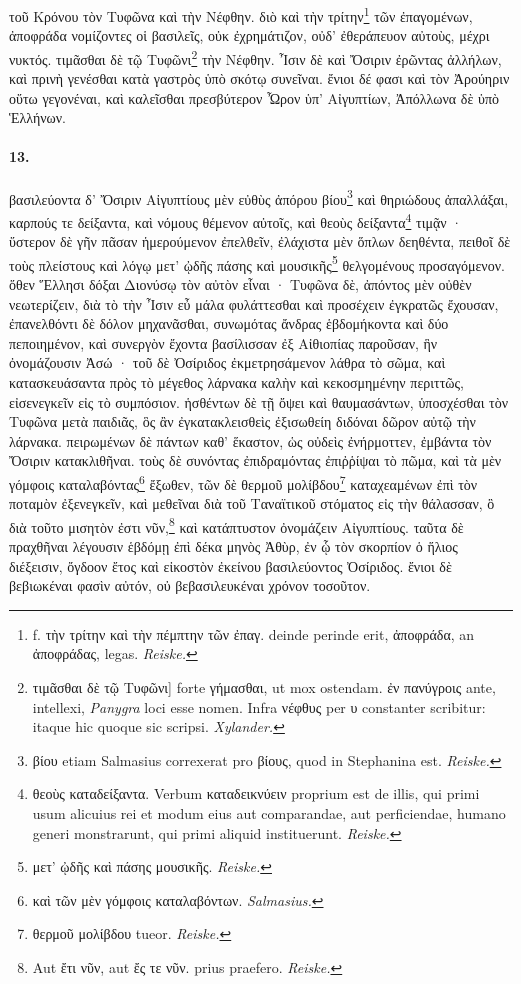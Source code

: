 \documentclass[a4paper, 11pt, oneside, polutonikogreek, german, landscape]{article}
\begin{document}
τοῦ Κρόνου τὸν Τυφῶνα καὶ τὴν Νέφθην. διὸ καὶ τὴν τρίτην\footnote{f. τὴν τρίτην καὶ τὴν πέμπτην τῶν ἐπαγ. deinde perinde erit, ἀποφράδα, an ἀποφράδας, legas. \emph{Reiske.}} τῶν ἐπαγομένων, ἀποφράδα νομίζοντες οἱ βασιλεῖς, οὐκ ἐχρημάτιζον, οὐδ' ἐθεράπευον αὐτοὺς, μέχρι νυκτός. τιμᾶσθαι δὲ τῷ Τυφῶνι\footnote{τιμᾶσθαι δὲ τῷ Τυφῶνι] forte γήμασθαι, ut mox ostendam. ἐν πανύγροις ante, intellexi, \emph{Panygra} loci esse nomen. Infra νέφθυς per υ constanter scribitur: itaque hic quoque sic scripsi. \emph{Xylander.}} τὴν Νέφθην. Ἶσιν δὲ καὶ Ὄσιριν ἐρῶντας ἀλλήλων, καὶ πρινὴ γενέσθαι κατὰ γαστρὸς ὑπὸ σκότῳ συνεῖναι. ἔνιοι δέ φασι καὶ τὸν Ἀρούηριν οὕτω γεγονέναι, καὶ καλεῖσθαι πρεσβύτερον Ὦρον ὑπ' Αἰγυπτίων, Ἀπόλλωνα δὲ ὑπὸ Ἑλλήνων.

\paragraph{13.}
βασιλεύοντα δ' Ὄσιριν Αἰγυπτίους μὲν εὐθὺς ἀπόρου βίου\footnote{βίου etiam Salmasius correxerat pro βίους, quod in Stephanina est. \emph{Reiske.}} καὶ θηριώδους ἀπαλλάξαι, καρπούς τε δείξαντα, καὶ νόμους θέμενον αὐτοῖς, καὶ θεοὺς δείξαντα\footnote{θεοὺς καταδείξαντα. Verbum καταδεικνύειν proprium est de illis, qui primi usum alicuius rei et modum eius aut comparandae, aut perficiendae, humano generi monstrarunt, qui primi aliquid instituerunt. \emph{Reiske.}} τιμᾷν · ὕστερον δὲ γῆν πᾶσαν ἡμερούμενον ἐπελθεῖν, ἐλάχιστα μὲν ὅπλων δεηθέντα, πειθοῖ δὲ τοὺς πλείστους καὶ λόγῳ μετ' ᾠδῆς πάσης καὶ μουσικῆς\footnote{μετ' ᾠδῆς καὶ πάσης μουσικῆς. \emph{Reiske.}} θελγομένους προσαγόμενον. ὅθεν Ἕλλησι δόξαι Διονύσῳ τὸν αὐτὸν εἶναι · Τυφῶνα δὲ, ἀπόντος μὲν οὐθὲν νεωτερίζειν, διὰ τὸ τὴν Ἶσιν εὖ μάλα φυλάττεσθαι καὶ προσέχειν ἐγκρατῶς ἔχουσαν, ἐπανελθόντι δὲ δόλον μηχανᾶσθαι, συνωμότας ἄνδρας ἑβδομήκοντα καὶ δύο πεποιημένον, καὶ συνεργὸν ἔχοντα βασίλισσαν ἐξ Αἰθιοπίας παροῦσαν, ἣν ὀνομάζουσιν Ἀσώ · τοῦ δὲ Ὀσίριδος ἐκμετρησάμενον λάθρα τὸ σῶμα, καὶ κατασκευάσαντα πρὸς τὸ μέγεθος λάρνακα καλὴν καὶ κεκοσμημένην περιττῶς, εἰσενεγκεῖν εἰς τὸ συμπόσιον. ἡσθέντων δὲ τῇ ὄψει καὶ θαυμασάντων, ὑποσχέσθαι τὸν Τυφῶνα μετὰ παιδιᾶς, ὃς ἂν ἐγκατακλεισθεὶς ἐξισωθείη διδόναι δῶρον αὐτῷ τὴν λάρνακα. πειρωμένων δὲ πάντων καθ' ἕκαστον, ὡς οὐδεὶς ἐνήρμοττεν, ἐμβάντα τὸν Ὄσιριν κατακλιθῆναι. τοὺς δὲ συνόντας ἐπιδραμόντας ἐπιῤῥίψαι τὸ πῶμα, καὶ τὰ μὲν γόμφοις καταλαβόντας\footnote{καὶ τῶν μὲν γόμφοις καταλαβόντων. \emph{Salmasius.}} ἔξωθεν, τῶν δὲ θερμοῦ μολίβδου\footnote{θερμοῦ μολίβδου tueor. \emph{Reiske.}} καταχεαμένων ἐπὶ τὸν ποταμὸν ἐξενεγκεῖν, καὶ μεθεῖναι διὰ τοῦ Ταναϊτικοῦ στόματος εἰς τὴν θάλασσαν, ὃ διὰ τοῦτο μισητὸν ἐστι νῦν,\footnote{Aut ἔτι νῦν, aut ἔς τε νῦν. prius praefero. \emph{Reiske.}} καὶ κατάπτυστον ὀνομάζειν Αἰγυπτίους. ταῦτα δὲ πραχθῆναι λέγουσιν ἑβδόμῃ ἐπὶ δέκα μηνὸς Ἀθὺρ, ἐν ᾧ τὸν σκορπίον ὁ ἥλιος διέξεισιν, ὄγδοον ἔτος καὶ εἰκοστὸν ἐκείνου βασιλεύοντος Ὀσίριδος. ἔνιοι δὲ βεβιωκέναι φασὶν αὐτόν, οὐ βεβασιλευκέναι χρόνον τοσοῦτον.
\end{document}
